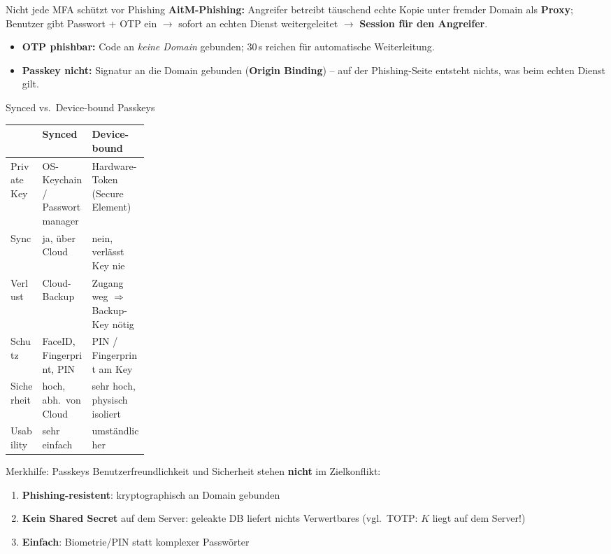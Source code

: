 \documentclass[a4paper, fontsize=7pt]{scrartcl}
\renewcommand*{\arraystretch}{1.5}  %
\begin{document}
\begin{mainbox}{Nicht jede MFA schützt vor Phishing}
\textbf{AitM-Phishing:} Angreifer betreibt täuschend echte Kopie unter
fremder Domain als \textbf{Proxy}; Benutzer gibt Passwort + OTP ein $\to$
sofort an echten Dienst weitergeleitet $\to$ \textbf{Session für den
Angreifer}.
\begin{itemize}
    \item \textbf{OTP phishbar:} Code an \emph{keine Domain} gebunden; 30\,s
          reichen für automatische Weiterleitung.
    \item \textbf{Passkey nicht:} Signatur an die Domain gebunden
          (\textbf{Origin Binding}) -- auf der Phishing-Seite entsteht
          nichts, was beim echten Dienst gilt.
\end{itemize}
\end{mainbox}

\begin{subbox}{Synced vs.\ Device-bound Passkeys}
\renewcommand*{\arraystretch}{1.15}
\setlength{\tabcolsep}{3pt}
\begin{tabularx}{\linewidth}{@{}>{\raggedright\arraybackslash}p{0.23\linewidth}|>{\raggedright\arraybackslash}X|>{\raggedright\arraybackslash}X@{}}
 & \textbf{Synced} & \textbf{Device-bound} \\
\hline
Private Key & OS-Keychain / Passwortmanager & Hardware-Token
  (Secure Element) \\
Sync & ja, über Cloud & nein, verlässt Key nie \\
Verlust & Cloud-Backup & Zugang weg $\Rightarrow$ Backup-Key nötig \\
Schutz & FaceID, Fingerprint, PIN & PIN / Fingerprint am Key \\
Sicherheit & hoch, abh.\ von Cloud & sehr hoch, physisch isoliert \\
Usability & sehr einfach & umständlicher \\
\end{tabularx}
\end{subbox}

\begin{subbox}{Merkhilfe: Passkeys}
Benutzerfreundlichkeit und Sicherheit stehen \textbf{nicht} im Zielkonflikt:
\begin{enumerate}
    \item \textbf{Phishing-resistent}: kryptographisch an Domain gebunden
    \item \textbf{Kein Shared Secret} auf dem Server: geleakte DB liefert
          nichts Verwertbares (vgl.\ TOTP: $K$ liegt auf dem Server!)
    \item \textbf{Einfach}: Biometrie/PIN statt komplexer Passwörter
\end{enumerate}
\end{subbox}
\end{document}
